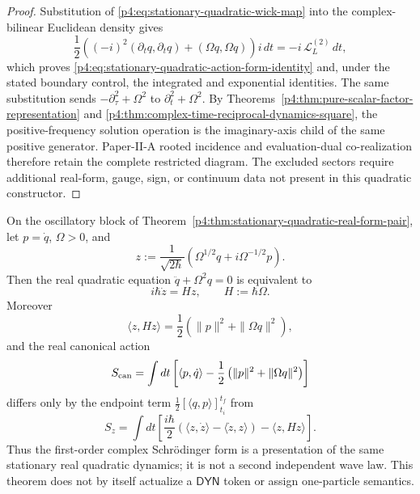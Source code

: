 \documentclass[12pt,a4paper]{article}
\begin{document}
\begin{proof}
Substitution of \eqref{p4:eq:stationary-quadratic-wick-map} into the
complex-bilinear Euclidean density gives
\[
 \frac12\left(
 (-i)^2(\partial_tq,\partial_tq)+(\Omega q,\Omega q)
 \right)i\,dt
 =-i\,\mathcal L_L^{(2)}\,dt,
\]
which proves \eqref{p4:eq:stationary-quadratic-action-form-identity} and,
under the stated boundary control, the integrated and exponential identities.
The same substitution sends
\(-\partial_\tau^2+\Omega^2\) to
\(\partial_t^2+\Omega^2\).  By
Theorems~\ref{p4:thm:pure-scalar-factor-representation} and
\ref{p4:thm:complex-time-reciprocal-dynamics-square}, the positive-frequency
solution operation is the imaginary-axis child of the same positive generator.
Paper-II-A rooted incidence and evaluation-dual co-realization therefore retain
the complete restricted diagram.  The excluded sectors require additional
real-form, gauge, sign, or continuum data not present in this quadratic
constructor.
\end{proof}

\begin{theorem}
\label{p4:thm:v244-action-generated-schrodinger-form}
On the oscillatory block of
Theorem~\ref{p4:thm:stationary-quadratic-real-form-pair}, let
\(p=\dot q\), \(\Omega>0\), and
\begin{equation}
\label{p4:eq:v244-positive-frequency-coordinate}
 \boxed{
 z:=\frac1{\sqrt{2\hbar}}
 \left(\Omega^{1/2}q+i\Omega^{-1/2}p\right).}
\end{equation}
Then the real quadratic equation
\(\ddot q+\Omega^2q=0\) is equivalent to
\begin{equation}
\label{p4:eq:v244-schrodinger-from-real-action}
 \boxed{i\hbar\dot z=Hz,\qquad H:=\hbar\Omega.}
\end{equation}
Moreover
\[
 \langle z,Hz\rangle
 =\frac12\left(\|p\|^2+\|\Omega q\|^2\right),
\]
and the real canonical action
\[
 S_{\rm can}=\int dt\left[
 \langle p,\dot q\rangle
 -\frac12\left(\|p\|^2+\|\Omega q\|^2\right)\right]
\]
differs only by the endpoint term
\(\frac12[\langle q,p\rangle]_{t_i}^{t_f}\) from
\begin{equation}
\label{p4:eq:v244-schrodinger-action}
 \boxed{
 S_z=\int dt\left[
 \frac{i\hbar}{2}
 \left(\langle z,\dot z\rangle-\langle\dot z,z\rangle\right)
 -\langle z,Hz\rangle\right].}
\end{equation}
Thus the first-order complex Schr\"odinger form is a presentation of the same
stationary real quadratic dynamics; it is not a second independent wave law.
This theorem does not by itself actualize a \(\mathsf{DYN}\) token or assign
one-particle semantics.
\end{theorem}
\end{document}
